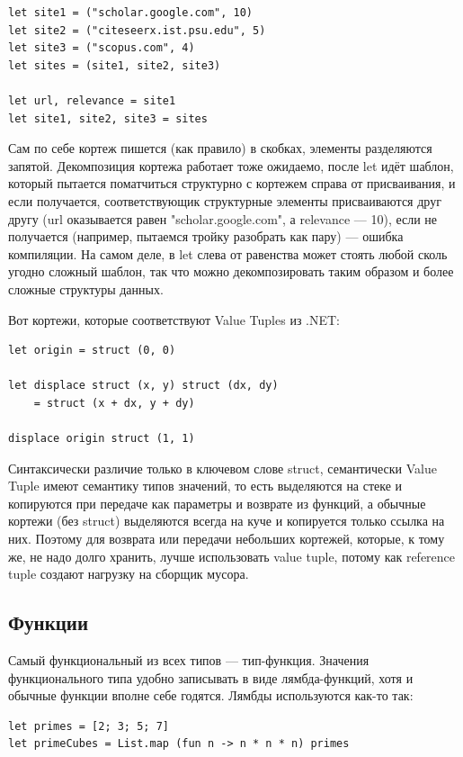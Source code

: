 \documentclass[a5paper]{article}
\begin{document}
\begin{verbatim}
let site1 = ("scholar.google.com", 10)
let site2 = ("citeseerx.ist.psu.edu", 5)
let site3 = ("scopus.com", 4)
let sites = (site1, site2, site3)

let url, relevance = site1
let site1, site2, site3 = sites
\end{verbatim}

Сам по себе кортеж пишется (как правило) в скобках, элементы разделяются запятой. Декомпозиция кортежа работает тоже ожидаемо, после let идёт шаблон, который пытается поматчиться структурно с кортежем справа от присваивания, и если получается, соответствующик структурные элементы присваиваются друг другу (url оказывается равен "scholar.google.com", а relevance --- 10), если не получается (например, пытаемся тройку разобрать как пару) --- ошибка компиляции. На самом деле, в let слева от равенства может стоять любой сколь угодно сложный шаблон, так что можно декомпозировать таким образом и более сложные структуры данных.

Вот кортежи, которые соответствуют Value Tuples из .NET:

\begin{verbatim}
let origin = struct (0, 0)

let displace struct (x, y) struct (dx, dy)
    = struct (x + dx, y + dy)

displace origin struct (1, 1)
\end{verbatim}

Синтаксически различие только в ключевом слове struct, семантически Value Tuple имеют семантику типов значений, то есть выделяются на стеке и копируются при передаче как параметры и возврате из функций, а обычные кортежи (без struct) выделяются всегда на куче и копируется только ссылка на них. Поэтому для возврата или передачи небольших кортежей, которые, к тому же, не надо долго хранить, лучше использовать value tuple, потому как reference tuple создают нагрузку на сборщик мусора.

\subsection{Функции}

Самый функциональный из всех типов --- тип-функция. Значения функционального типа удобно записывать в виде лямбда-функций, хотя и обычные функции вполне себе годятся. Лямбды используются как-то так:

\begin{verbatim}
let primes = [2; 3; 5; 7]
let primeCubes = List.map (fun n -> n * n * n) primes
\end{verbatim}
\end{document}

